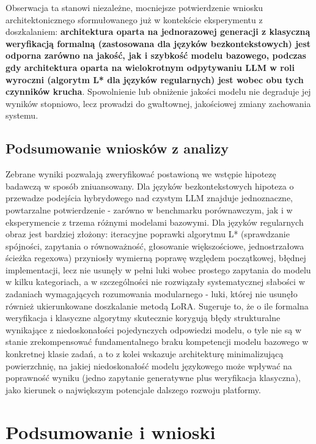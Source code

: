 \documentclass[12pt]{article}
\begin{document}
Obserwacja ta stanowi niezależne, mocniejsze potwierdzenie wniosku architektonicznego sformułowanego już w kontekście eksperymentu z doszkalaniem: \textbf{architektura oparta na jednorazowej generacji z klasyczną weryfikacją formalną (zastosowana dla języków bezkontekstowych) jest odporna zarówno na jakość, jak i szybkość modelu bazowego, podczas gdy architektura oparta na wielokrotnym odpytywaniu LLM w roli wyroczni (algorytm L* dla języków regularnych) jest wobec obu tych czynników krucha}. Spowolnienie lub obniżenie jakości modelu nie degraduje jej wyników stopniowo, lecz prowadzi do gwałtownej, jakościowej zmiany zachowania systemu.

\subsection{Podsumowanie wniosków z analizy}

Zebrane wyniki pozwalają zweryfikować postawioną we wstępie hipotezę badawczą w sposób zniuansowany. Dla języków bezkontekstowych hipoteza o przewadze podejścia hybrydowego nad czystym LLM znajduje jednoznaczne, powtarzalne potwierdzenie - zarówno w benchmarku porównawczym, jak i w eksperymencie z trzema różnymi modelami bazowymi. Dla języków regularnych obraz jest bardziej złożony: iteracyjne poprawki algorytmu L* (sprawdzanie spójności, zapytania o równoważność, głosowanie większościowe, jednostrzałowa ścieżka regexowa) przyniosły wymierną poprawę względem początkowej, błędnej implementacji, lecz nie usunęły w pełni luki wobec prostego zapytania do modelu w kilku kategoriach, a w szczególności nie rozwiązały systematycznej słabości w zadaniach wymagających rozumowania modularnego - luki, której nie usunęło również ukierunkowane doszkalanie metodą LoRA. Sugeruje to, że o ile formalna weryfikacja i klasyczne algorytmy skutecznie korygują błędy strukturalne wynikające z niedoskonałości pojedynczych odpowiedzi modelu, o tyle nie są w stanie zrekompensować fundamentalnego braku kompetencji modelu bazowego w konkretnej klasie zadań, a to z kolei wskazuje architekturę minimalizującą powierzchnię, na jakiej niedoskonałość modelu językowego może wpływać na poprawność wyniku (jedno zapytanie generatywne plus weryfikacja klasyczna), jako kierunek o największym potencjale dalszego rozwoju platformy.


\section{Podsumowanie i wnioski}
\end{document}
